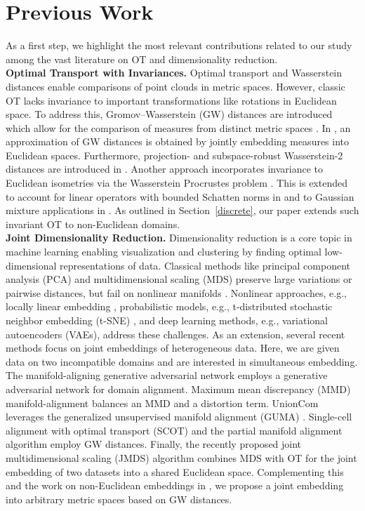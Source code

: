 \section{Previous Work}
As a first step, we highlight the most relevant contributions related to our study among the vast literature on OT and dimensionality reduction.
\\[1ex]
\textbf{Optimal Transport with Invariances.} 
Optimal transport and Wasserstein distances enable comparisons of point clouds in metric spaces. 
However, 
classic OT
lacks invariance to important transformations 
like rotations in Euclidean space. 
To address this,
Gromov--Wasserstein (GW) distances 
are introduced which allow 
for the comparison of
measures from distinct metric spaces 
\cite{memoli2011gromov,sturm2006}. 
In \cite{alaya2022theoretical},
an approximation of GW distances is obtained
by jointly embedding measures 
into Euclidean spaces. 
Furthermore,
projection- and
subspace-robust Wasserstein-2 distances
are introduced in 
\cite{paty2019subspace}. 
Another approach incorporates invariance 
to Euclidean isometries 
via the Wasserstein Procrustes problem \cite{grave2019unsupervised}.
This is extended to account 
for linear operators 
with bounded Schatten norms in \cite{alvarez2019towards} 
and to Gaussian mixture applications in \cite{salmona2023gromov}. 
As outlined in Section~\ref{discrete}, our paper extends such invariant OT to non-Euclidean domains.
\\[1ex]
\textbf{Joint Dimensionality Reduction.} 
Dimensionality reduction is a core topic in machine learning enabling visualization and clustering by finding optimal low-dimensional representations of data. Classical methods like principal component analysis (PCA) \cite{greenacre2022principal} and multidimensional scaling (MDS) \cite{carroll1998multidimensional} preserve large variations or pairwise distances, but fail on nonlinear manifolds \cite{alaya2022theoretical,dengneuc}. 
Nonlinear approaches, e.g., locally linear embedding \cite{roweis2000nonlinear}, 
probabilistic models, e.g., t-distributed stochastic neighbor embedding (t-SNE) \cite{van2008visualizing}, and deep learning methods, e.g., variational autoencoders (VAEs), \cite{kingma2019introduction} address these challenges. 
As an extension, several recent methods focus on joint embeddings of heterogeneous data. Here, we are given data on two incompatible domains and are interested in simultaneous embedding. The manifold-aligning generative adversarial network \cite{amodio2018magan} employs a generative adversarial network for domain alignment. Maximum mean discrepancy (MMD) manifold-alignment \cite{liu2019jointly} balances an MMD and a distortion term. UnionCom \cite{cao2020unsupervised} leverages the generalized unsupervised manifold alignment (GUMA) \cite{cui2014generalized}.  Single-cell alignment with optimal transport (SCOT) \cite{demetci2022scot} and the partial manifold alignment algorithm \cite{cao2022manifold} employ GW distances. Finally, the recently proposed joint multidimensional scaling (JMDS) \cite{chen2023unsupervised} algorithm combines MDS with OT for the joint embedding of two 
datasets into a shared Euclidean space. Complementing this and the work on non-Euclidean embeddings in \cite{mcinnes2018umap,dengneuc}, we propose a joint embedding into arbitrary metric spaces based on GW distances.